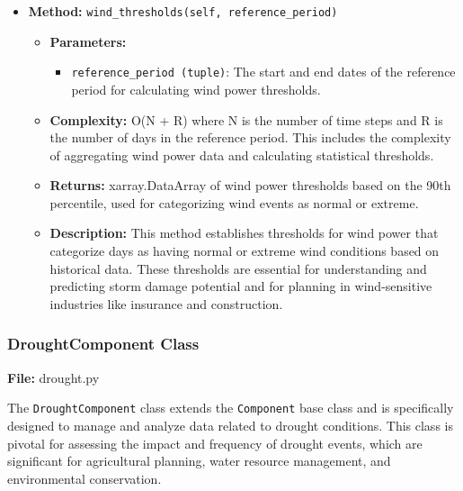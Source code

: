 \documentclass[a4paper,12pt]{article}
\begin{document}
\begin{itemize}
    \item \textbf{Method:} \texttt{wind\_thresholds(self, reference\_period)}
    \begin{itemize}
        \item \textbf{Parameters:}
        \begin{itemize}
            \item \texttt{reference\_period (tuple)}: The start and end dates of the reference period for calculating wind power thresholds.
        \end{itemize}
        \item \textbf{Complexity:} O(N + R) where N is the number of time steps and R is the number of days in the reference period. This includes the complexity of aggregating wind power data and calculating statistical thresholds.
        \item \textbf{Returns:} xarray.DataArray of wind power thresholds based on the 90th percentile, used for categorizing wind events as normal or extreme.
        \item \textbf{Description:} This method establishes thresholds for wind power that categorize days as having normal or extreme wind conditions based on historical data. These thresholds are essential for understanding and predicting storm damage potential and for planning in wind-sensitive industries like insurance and construction.
    \end{itemize}
\end{itemize}


\subsubsection{DroughtComponent Class}
\textbf{File:} drought.py

The \texttt{DroughtComponent} class extends the \texttt{Component} base class and is specifically designed to manage and analyze data related to drought conditions. This class is pivotal for assessing the impact and frequency of drought events, which are significant for agricultural planning, water resource management, and environmental conservation.
\end{document}
